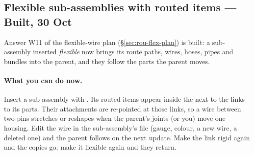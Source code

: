 \subsection{Flexible sub-assemblies with routed items --- Built, 30 Oct}\label{sec:flexsub-built}

Answer W11 of the flexible-wire plan (\S\ref{sec:rou-flex-plan}) is built: a sub-assembly inserted \emph{flexible} now
brings its route paths, wires, hoses, pipes and bundles into the parent, and they follow the parts the parent moves.

\paragraph{What you can do now.} Insert a sub-assembly with . Its routed items appear inside the
 next to the links to its parts. Their attachments are re-pointed at those links, so a wire
between two pins stretches or reshapes when the parent's joints (or you) move one housing. Edit the wire in the
sub-assembly's file (gauge, colour, a new wire, a deleted one) and the parent follows on the next update. Make the
link rigid again and the copies go; make it flexible again and they return.

